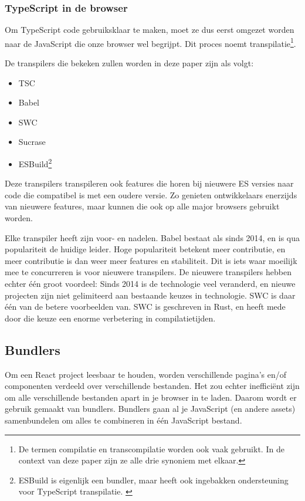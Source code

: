 \subsubsection{TypeScript in de browser}
Om TypeScript code gebruiksklaar te maken, moet ze dus eerst omgezet worden naar de JavaScript die onze browser wel begrijpt. Dit proces noemt transpilatie\footnote{De termen compilatie en transcompilatie worden ook vaak gebruikt. In de context van deze paper zijn ze alle drie synoniem met elkaar.}.

De transpilers die bekeken zullen worden in deze paper zijn als volgt:

\begin{itemize}
  \item TSC
  \item Babel
  \item SWC
  \item Sucrase
  \item ESBuild\footnote{ESBuild is eigenlijk een bundler, maar heeft ook ingebakken ondersteuning voor TypeScript transpilatie. \autocite{reilly_2021}}
\end{itemize}

Deze transpilers transpileren ook features die horen bij nieuwere ES versies naar code die compatibel is met een oudere versie. Zo genieten ontwikkelaars enerzijds van nieuwere features, maar kunnen die ook op alle major browsers gebruikt worden.

Elke transpiler heeft zijn voor- en nadelen. Babel bestaat als sinds 2014, en is qua populariteit de huidige leider. Hoge populariteit betekent meer contributie, en meer contributie is dan weer meer features en stabiliteit. Dit is iets waar moeilijk mee te concurreren is voor nieuwere transpilers. De nieuwere transpilers hebben echter één groot voordeel: Sinds 2014 is de technologie veel veranderd, en nieuwe projecten zijn niet gelimiteerd aan bestaande keuzes in technologie. SWC is daar één van de betere voorbeelden van. SWC is geschreven in Rust, en heeft mede door die keuze een enorme verbetering in compilatietijden. \autocite{kang_2020, khosravi_2020}

\subsection{Bundlers}

Om een React project leesbaar te houden, worden verschillende pagina's en/of componenten verdeeld over verschillende bestanden. Het zou echter inefficiënt zijn om alle verschillende bestanden apart in je browser in te laden. Daarom wordt er gebruik gemaakt van bundlers. Bundlers gaan al je JavaScript (en andere assets) samenbundelen om alles te combineren in één JavaScript bestand.


